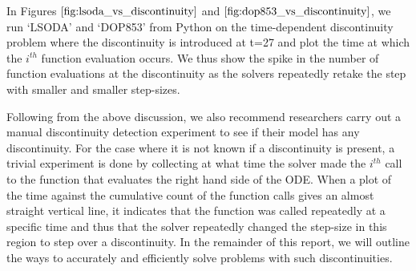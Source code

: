 In Figures $\ref{fig:lsoda_vs_discontinuity}$ and $\ref{fig:dop853_vs_discontinuity}$, we run `LSODA' and `DOP853' from Python on the time-dependent discontinuity problem where the discontinuity is introduced at t=27 and plot the time at which the $i^{th}$ function evaluation occurs. We thus show the spike in the number of function evaluations at the discontinuity as the solvers repeatedly retake the step with smaller and smaller step-sizes.

Following from the above discussion, we also recommend researchers carry out a manual discontinuity detection experiment to see if their model has any discontinuity. For the case where it is not known if a discontinuity is present, a trivial experiment is done by collecting at what time the solver made the $i^{th}$ call to the function that evaluates the right hand side of the ODE. When a plot of the time against the cumulative count of the function calls gives an almost straight vertical line, it indicates that the function was called repeatedly at a specific time and thus that the solver repeatedly changed the step-size in this region to step over a discontinuity. In the remainder of this report, we will outline the ways to accurately and efficiently solve problems with such discontinuities.
